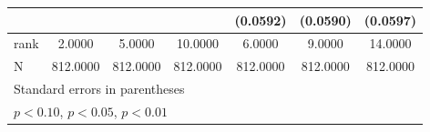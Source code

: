 {\begin{tabular}{l*{6}{c}}
                    &                     &                     &                     &    (0.0592)         &    (0.0590)         &    (0.0597)         \\
\midrule
rank                &      2.0000         &      5.0000         &     10.0000         &      6.0000         &      9.0000         &     14.0000         \\
N                   &    812.0000         &    812.0000         &    812.0000         &    812.0000         &    812.0000         &    812.0000         \\
\bottomrule
\multicolumn{7}{l}{\footnotesize Standard errors in parentheses}\\
\multicolumn{7}{l}{\footnotesize \sym{*} \(p<0.10\), \sym{**} \(p<0.05\), \sym{***} \(p<0.01\)}\\
\end{tabular}
}
